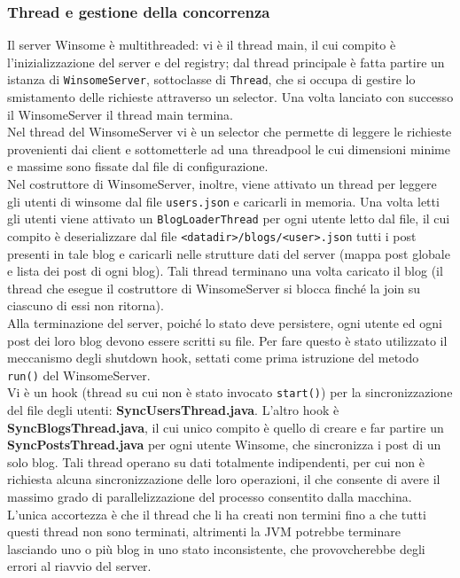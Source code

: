 \subsubsection{Thread e gestione della concorrenza}
Il server Winsome è multithreaded: vi è il thread main, il cui compito è l'inizializzazione del server e del registry; dal thread principale è fatta partire un istanza di \verb|WinsomeServer|, sottoclasse di \verb|Thread|, che si occupa di gestire lo smistamento delle richieste attraverso un selector. Una volta lanciato con successo il WinsomeServer il thread main termina.\\
Nel thread del WinsomeServer vi è un selector che permette di leggere le richieste provenienti dai client e sottometterle ad una threadpool le cui dimensioni minime e massime sono fissate dal file di configurazione.\\
Nel costruttore di WinsomeServer, inoltre, viene attivato un thread per leggere gli utenti di winsome dal file \verb|users.json| e caricarli in memoria. Una volta letti gli utenti viene attivato un \verb|BlogLoaderThread| per ogni utente letto dal file, il cui compito è deserializzare dal file \verb|<datadir>/blogs/<user>.json| tutti i post presenti in tale blog e caricarli nelle strutture dati del server (mappa post globale e lista dei post di ogni blog). Tali thread terminano una volta caricato il blog (il thread che esegue il costruttore di WinsomeServer si blocca finché la join su ciascuno di essi non ritorna).\\
Alla terminazione del server, poiché lo stato deve persistere, ogni utente ed ogni post dei loro blog devono essere scritti su file. Per fare questo è stato utilizzato
il meccanismo degli shutdown hook, settati come prima istruzione del metodo \verb|run()| del WinsomeServer.\\
Vi è un hook (thread su cui non è stato invocato \verb|start()|) per la sincronizzazione del file degli utenti: \textbf{SyncUsersThread.java}. L'altro hook è \textbf{SyncBlogsThread.java}, il cui unico compito è quello di creare e far partire un \textbf{SyncPostsThread.java} per ogni utente Winsome, che sincronizza i post di un solo blog. Tali thread operano su dati totalmente indipendenti, per cui non è richiesta alcuna sincronizzazione delle loro operazioni, il che consente di avere il massimo grado di parallelizzazione del processo consentito dalla macchina. L'unica accortezza è che il thread che li ha creati non termini fino a che tutti questi thread non sono terminati, altrimenti la JVM potrebbe terminare lasciando uno o più blog in uno stato inconsistente, che provovcherebbe degli errori al riavvio del server.